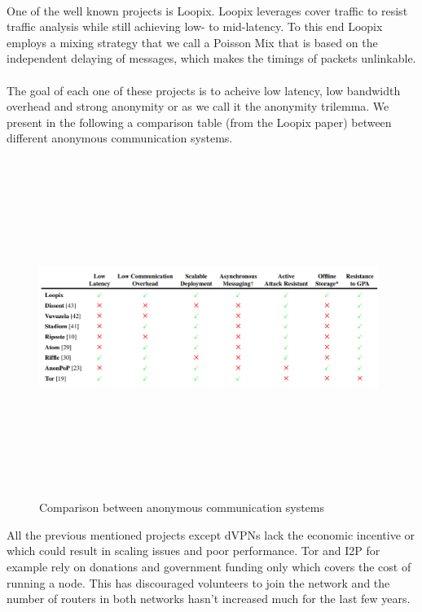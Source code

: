 \\ One of the well known projects is Loopix. Loopix leverages cover traffic to resist traffic analysis while still achieving low- to mid-latency. To this end Loopix employs a mixing strategy that we call a Poisson Mix that is based on the independent delaying of messages, which makes the timings of packets unlinkable.
\\~\\ The goal of each one of these projects is to acheive low latency, low bandwidth overhead and strong anonymity or as we call it the anonymity trilemma. We present in the following a comparison table (from the Loopix paper) between different anonymous communication systems.

\begin{figure}[H]
    \centering
    \includegraphics[width=11cm,height=11cm,keepaspectratio]{../whitepaper/images/state-of-the-art.png}
    \caption{Comparison between anonymous communication systems}
    \label{fig:Comparison between anonymous communication systems}
\end{figure}
\hspace{-5mm}All the previous mentioned projects except dVPNs lack the economic incentive or which could result in scaling issues and poor performance. Tor and I2P for example rely on donations and government funding only which covers the cost of running a node. This has discouraged volunteers to join the network and the number of routers in both networks hasn't increased much for the last few years.

